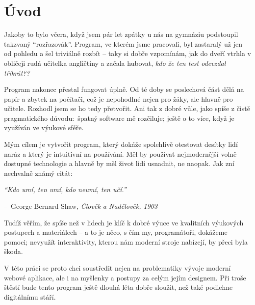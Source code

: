 \makeatletter
\renewcommand{\@chapapp}{}%
\newenvironment{chapquote}[2][2em]
  {\setlength{\@tempdima}{#1}%
   \def\chapquote@author{#2}%
   \parshape 1 \@tempdima \dimexpr\textwidth-2\@tempdima\relax%
   \itshape}
  {\par\normalfont\hfill--\ \chapquote@author\hspace*{\@tempdima}\par\bigskip}
\makeatother

\chapter*{Úvod}

Jakoby to bylo včera, když jsem pár let zpátky u nás na gymnáziu podstoupil takzvaný \enquote{rozřazovák}. Program, ve kterém jsme pracovali, byl zastaralý už jen od pohledu a šel triviálně rozbít -- taky si dobře vzpomínám, jak do dveří vtrhla v obličeji rudá učitelka angličtiny a začala hubovat, \textit{kdo že ten test odevzdal třikrát??}

Program nakonec přestal fungovat úplně. Od té doby se poslechová část dělá na papír a zbytek na počítači, což je nepohodlné nejen pro žáky, ale hlavně pro učitele. Rozhodl jsem se ho tedy přetvořit. Ani tak z dobré vůle, jako spíše z čistě pragmatického důvodu:~špatný software mě rozčiluje; ještě o to více, když je využíván ve výukové sféře.

Mým cílem je vytvořit program, který dokáže spolehlivě otestovat desítky lidí naráz a který je intuitivní na používání. Měl by používat nejmodernější volně dostupné technologie a hlavně by měl život lidí usnadnit, ne naopak. Jak zní nechvalně známý citát:

\begin{chapquote}{George Bernard Shaw, \textit{Člověk a Nadčlověk, 1903}}
    \enquote{Kdo umí, ten umí, kdo neumí, ten učí.}
\end{chapquote}

Tudíž věřím, že spíše než v lidech je klíč k dobré výuce ve kvalitních výukových postupech a materiálech -- a to je něco, s čím my, programátoři, dokážeme pomoci; nevyužít interaktivity, kterou nám moderní stroje nabízejí, by přeci byla škoda.

V této práci se proto chci soustředit nejen na problematiky vývoje moderní webové aplikace, ale i na myšlenky a postupy za celým jejím designem. Při troše štěstí bude tento program ještě dlouhá léta dobře sloužit, než také podlehne digitálnímu stáří.
